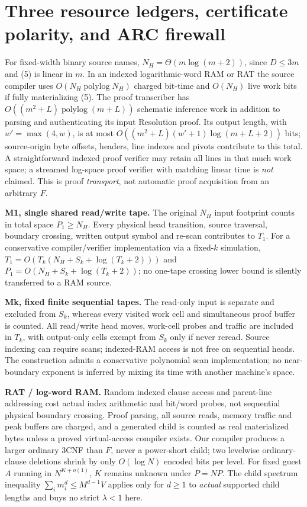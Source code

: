 \documentclass[11pt]{article}
\begin{document}
\section{Three resource ledgers, certificate polarity, and ARC firewall}
For fixed-width binary source names, $N_H=\Theta(m\log(m+2))$, since $D\le3m$ and (5) is linear in $m$. In an indexed logarithmic-word RAM or RAT the source compiler uses $O(N_H\operatorname{polylog}N_H)$ charged bit-time and $O(N_H)$ live work bits if fully materializing (5). The proof transcriber has $O((m^2+L)\operatorname{polylog}(m+L))$ schematic inference work in addition to parsing and authenticating its input Resolution proof. Its output length, with $w'=\max(4,w)$, is at most $O((m^2+L)(w'+1)\log(m+L+2))$ bits; source-origin byte offsets, headers, line indexes and pivots contribute to this total. A straightforward indexed proof verifier may retain all lines in that much work space; a streamed log-space proof verifier with matching linear time is \emph{not} claimed. This is proof \emph{transport}, not automatic proof acquisition from an arbitrary $F$.

\noindent\textbf{M1, single shared read/write tape.} The original $N_H$ input footprint counts in total space $P_1\ge N_H$. Every physical head transition, source traversal, boundary crossing, written output symbol and re-scan contributes to $T_1$. For a conservative compiler/verifier implementation via a fixed-$k$ simulation, $T_1=O(T_k(N_H+S_k+\log(T_k+2)))$ and $P_1=O(N_H+S_k+\log(T_k+2))$; no one-tape crossing lower bound is silently transferred to a RAM source.

\noindent\textbf{Mk, fixed finite sequential tapes.} The read-only input is separate and excluded from $S_k$, whereas every visited work cell and simultaneous proof buffer is counted. All read/write head moves, work-cell probes and traffic are included in $T_k$, with output-only cells exempt from $S_k$ only if never reread. Source indexing can require scans; indexed-RAM access is not free on sequential heads. The construction admits a conservative polynomial scan implementation; no near-boundary exponent is inferred by mixing its time with another machine's space.

\noindent\textbf{RAT / log-word RAM.} Random indexed clause access and parent-line addressing cost actual index arithmetic and bit/word probes, not sequential physical boundary crossing. Proof parsing, all source reads, memory traffic and peak buffers are charged, and a generated child is counted as real materialized bytes unless a proved virtual-access compiler exists. Our compiler produces a larger ordinary 3CNF than $F$, never a power-short child; two levelwise ordinary-clause deletions shrink by only $O(\log N)$ encoded bits per level. For fixed guest $A$ running in $N^{K+o(1)}$, $K$ remains unknown under $P=NP$. The child spectrum inequality $\sum_i m_i^d\le M^{d-1}V$ applies only for $d\ge1$ to \emph{actual} supported child lengths and buys no strict $\lambda<1$ here.
\end{document}
